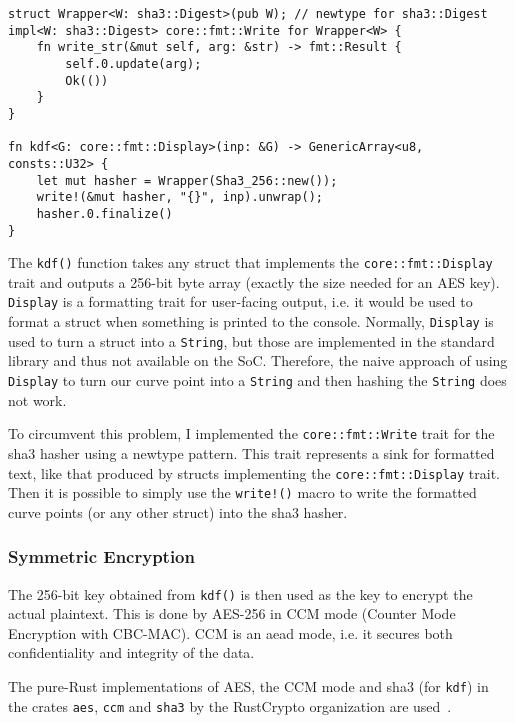 \begin{lstlisting}[caption={Hash-based key derivation Function for curve points},label={lst:kdf}]
struct Wrapper<W: sha3::Digest>(pub W); // newtype for sha3::Digest
impl<W: sha3::Digest> core::fmt::Write for Wrapper<W> {
    fn write_str(&mut self, arg: &str) -> fmt::Result {
        self.0.update(arg);
        Ok(())
    }
}

fn kdf<G: core::fmt::Display>(inp: &G) -> GenericArray<u8, consts::U32> {
    let mut hasher = Wrapper(Sha3_256::new());
    write!(&mut hasher, "{}", inp).unwrap();
    hasher.0.finalize()
}
\end{lstlisting}

The \verb+kdf()+ function takes any struct that implements the \texttt{core::fmt::Display} trait and outputs a 256-bit byte array (exactly the size needed for an AES key).
\texttt{Display} is a formatting trait for user-facing output, i.e. it would be used to format a struct when something is printed to the console.
Normally, \texttt{Display} is used to turn a struct into a \verb+String+, but those are implemented in the standard library and thus not available on the SoC.
Therefore, the naive approach of using \texttt{Display} to turn our curve point into a \texttt{String} and then hashing the \texttt{String} does not work.

To circumvent this problem, I implemented the \verb+core::fmt::Write+ trait for the \acrshort{sha3} hasher using a newtype pattern.
This trait represents a sink for formatted text, like that produced by structs implementing the \verb+core::fmt::Display+ trait.
Then it is possible to simply use the \verb+write!()+ macro to write the formatted curve points (or any other struct) into the \acrshort{sha3} hasher.

\subsubsection{Symmetric Encryption}

The 256-bit key obtained from \texttt{kdf()} is then used as the key to encrypt the actual plaintext.
This is done by AES-256 in CCM mode (Counter Mode Encryption with CBC-MAC).
CCM is an \acrshort{aead} mode, i.e. it secures both confidentiality and integrity of the data.

The pure-Rust implementations of AES, the CCM mode and \acrshort{sha3} (for \texttt{kdf}) in the crates \texttt{aes}, \texttt{ccm} and \texttt{sha3} by the RustCrypto organization are used~\cite{noauthor_rustcrypto_nodate}.

